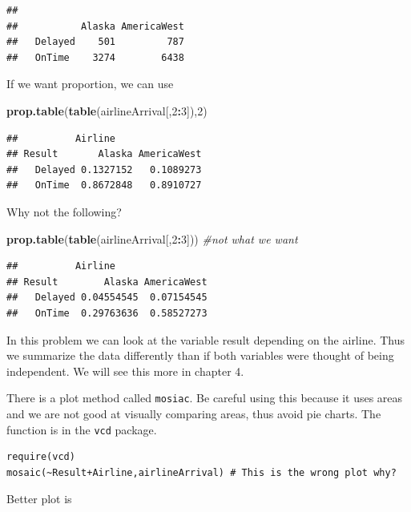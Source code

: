 \documentclass[]{book}
\newenvironment{Shaded}{\begin{snugshade}}{\end{snugshade}}
\newcommand{\KeywordTok}[1]{\textcolor[rgb]{0.13,0.29,0.53}{\textbf{#1}}}
\newcommand{\DecValTok}[1]{\textcolor[rgb]{0.00,0.00,0.81}{#1}}
\newcommand{\CommentTok}[1]{\textcolor[rgb]{0.56,0.35,0.01}{\textit{#1}}}
\newcommand{\OperatorTok}[1]{\textcolor[rgb]{0.81,0.36,0.00}{\textbf{#1}}}
\newcommand{\NormalTok}[1]{#1}
\theoremstyle{definition}
\theoremstyle{definition}
\theoremstyle{definition}
\theoremstyle{remark}
\begin{document}
\begin{verbatim}
##          
##           Alaska AmericaWest
##   Delayed    501         787
##   OnTime    3274        6438
\end{verbatim}

If we want proportion, we can use

\begin{Shaded}
\begin{Highlighting}[]
\KeywordTok{prop.table}\NormalTok{(}\KeywordTok{table}\NormalTok{(airlineArrival[,}\DecValTok{2}\OperatorTok{:}\DecValTok{3}\NormalTok{]),}\DecValTok{2}\NormalTok{)}
\end{Highlighting}
\end{Shaded}

\begin{verbatim}
##          Airline
## Result       Alaska AmericaWest
##   Delayed 0.1327152   0.1089273
##   OnTime  0.8672848   0.8910727
\end{verbatim}

Why not the following?

\begin{Shaded}
\begin{Highlighting}[]
\KeywordTok{prop.table}\NormalTok{(}\KeywordTok{table}\NormalTok{(airlineArrival[,}\DecValTok{2}\OperatorTok{:}\DecValTok{3}\NormalTok{])) }\CommentTok{#not what we want}
\end{Highlighting}
\end{Shaded}

\begin{verbatim}
##          Airline
## Result        Alaska AmericaWest
##   Delayed 0.04554545  0.07154545
##   OnTime  0.29763636  0.58527273
\end{verbatim}

In this problem we can look at the variable result depending on the
airline. Thus we summarize the data differently than if both variables
were thought of being independent. We will see this more in chapter 4.

There is a plot method called \texttt{mosiac}. Be careful using this
because it uses areas and we are not good at visually comparing areas,
thus avoid pie charts. The function is in the \texttt{vcd} package.

\begin{verbatim}
require(vcd)
mosaic(~Result+Airline,airlineArrival) # This is the wrong plot why?
\end{verbatim}

Better plot is
\end{document}
